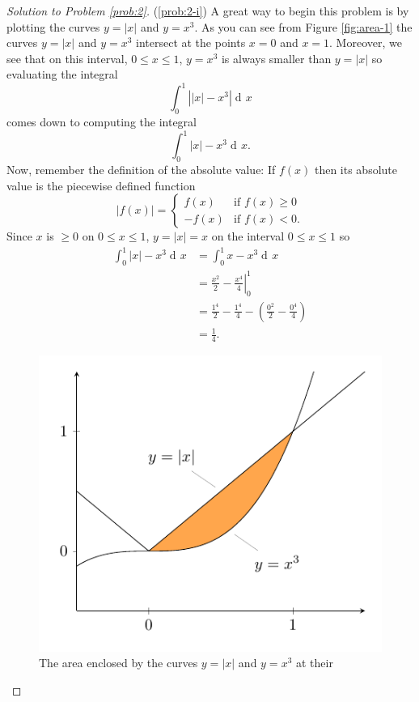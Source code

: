 \documentclass[12pt]{article}
\theoremstyle{plain}
\theoremstyle{definition}
\theoremstyle{remark}
\DeclareMathOperator{\diff}{d\!}
\begin{document}
\begin{proof}[Solution to Problem \ref{prob:2}]
(\ref{prob:2-i}) A great way to begin this problem is by plotting the curves $y=|x|$ and
$y=x^3$. As you can see from Figure \ref{fig:area-1} the curves $y=|x|$ and
$y=x^3$ intersect at the points $x=0$ and $x=1$. Moreover, we see that on
this interval, $0\leq x\leq 1$, $y=x^3$ is always smaller than $y=|x|$ so
evaluating the integral
 \[
\int_0^1\left||x|-x^3\right|\diff x
\]
comes down to computing the integral
\[
\int_0^1|x|-x^3\diff x.
\]
Now, remember the definition of the absolute value: If $f(x)$ then its
absolute value is the piecewise defined function
\begin{equation}
  \label{eq:absolute-value}
\left|f(x)\right|=
\begin{cases}
f(x)&\text{if $f(x)\geq 0$}\\
-f(x)&\text{if $f(x)<0$}.
\end{cases}
\end{equation}
Since $x$ is $\geq 0$ on $0\leq x\leq 1$, $y=|x|=x$ on the interval $0\leq
x\leq 1$ so
\begin{align*}
\int_0^1|x|-x^3\diff x
&=\int_0^1x-x^3\diff x\\
&=\left.\frac{x^2}{2}-\frac{x^4}{4}\right|_0^1\\
&=\frac{1^4}{2}-\frac{1^4}{4}-\left(\frac{0^2}{2}-\frac{0^4}{4}\right)\\
&=\boxed{\frac{1}{4}.}
\end{align*}
\begin{figure}[h]
\centering
\includegraphics{../figures/quiz-3-1}
\caption{The area enclosed by the curves $y=|x|$ and $y=x^3$ at their
}
\end{figure}
\end{proof}
\end{document}
